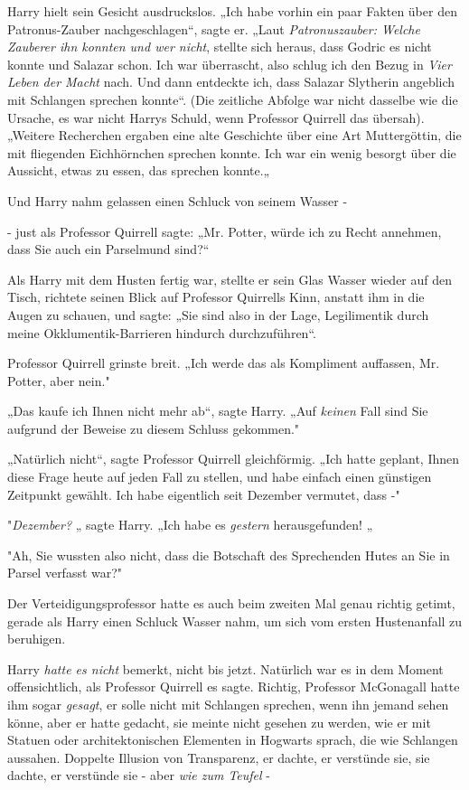 {Harry hielt sein Gesicht ausdruckslos. „Ich habe vorhin ein paar Fakten über den Patronus-Zauber nachgeschlagen“, sagte er. „Laut \emph{Patronuszauber: Welche Zauberer ihn konnten und wer nicht}, stellte sich heraus, dass Godric es nicht konnte und Salazar schon. Ich war überrascht, also schlug ich den Bezug in \emph{Vier Leben der Macht} nach. Und dann entdeckte ich, dass Salazar Slytherin angeblich mit Schlangen sprechen konnte“. (Die zeitliche Abfolge war nicht dasselbe wie die Ursache, es war nicht Harrys Schuld, wenn Professor Quirrell das übersah). „Weitere Recherchen ergaben eine alte Geschichte über eine Art Muttergöttin, die mit fliegenden Eichhörnchen sprechen konnte. Ich war ein wenig besorgt über die Aussicht, etwas zu essen, das sprechen konnte.„

Und Harry nahm gelassen einen Schluck von seinem Wasser -

- just als Professor Quirrell sagte: „Mr. Potter, würde ich zu Recht annehmen, dass Sie auch ein Parselmund sind?“

Als Harry mit dem Husten fertig war, stellte er sein Glas Wasser wieder auf den Tisch, richtete seinen Blick auf Professor Quirrells Kinn, anstatt ihm in die Augen zu schauen, und sagte: „Sie sind also in der Lage, Legilimentik durch meine Okklumentik-Barrieren hindurch durchzuführen“.

Professor Quirrell grinste breit. „Ich werde das als Kompliment auffassen, Mr. Potter, aber nein."

„Das kaufe ich Ihnen nicht mehr ab“, sagte Harry. „Auf \emph{keinen} Fall sind Sie aufgrund der Beweise zu diesem Schluss gekommen."

„Natürlich nicht“, sagte Professor Quirrell gleichförmig. „Ich hatte geplant, Ihnen diese Frage heute auf jeden Fall zu stellen, und habe einfach einen günstigen Zeitpunkt gewählt. Ich habe eigentlich seit Dezember vermutet, dass -"

"\emph{Dezember?} „ sagte Harry. „Ich habe es \emph{gestern} herausgefunden! „

"Ah, Sie wussten also nicht, dass die Botschaft des Sprechenden Hutes an Sie in Parsel verfasst war?"

Der Verteidigungsprofessor hatte es auch beim zweiten Mal genau richtig getimt, gerade als Harry einen Schluck Wasser nahm, um sich vom ersten Hustenanfall zu beruhigen.

Harry \emph{hatte es nicht} bemerkt, nicht bis jetzt. Natürlich war es in dem Moment offensichtlich, als Professor Quirrell es sagte. Richtig, Professor McGonagall hatte ihm sogar \emph{gesagt}, er solle nicht mit Schlangen sprechen, wenn ihn jemand sehen könne, aber er hatte gedacht, sie meinte nicht gesehen zu werden, wie er mit Statuen oder architektonischen Elementen in Hogwarts sprach, die wie Schlangen aussahen. Doppelte Illusion von Transparenz, er dachte, er verstünde sie, sie dachte, er verstünde sie - aber \emph{wie zum Teufel} -

}
